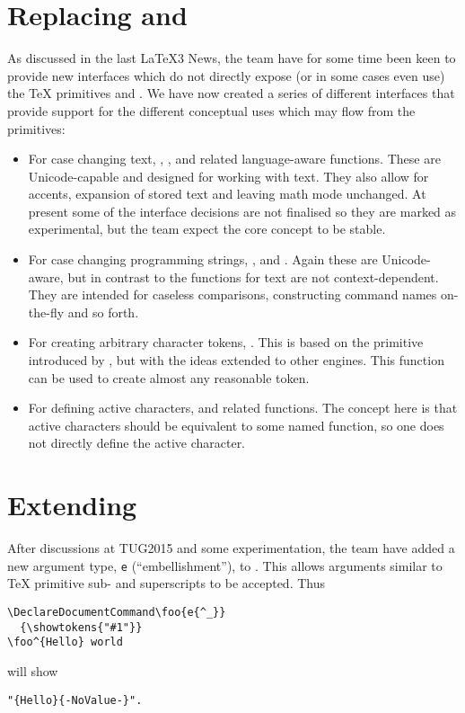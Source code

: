 \documentclass{ltnews}
\begin{document}
\section{Replacing  and }

As discussed in the last \LaTeX3 News, the team have for some time been keen to
provide new interfaces which do not directly expose (or in some cases even use)
the \TeX{} primitives  and . We have now created a
series of different interfaces that provide support for the different
conceptual uses which may flow from the primitives:
\begin{itemize}
  \item For case changing text, , ,
     and related language-aware functions. These are
    Unicode-capable and designed for working with text. They also allow for
    accents, expansion of stored text and leaving math mode unchanged.  At
    present some of the interface decisions are not finalised so they are
    marked as experimental, but the team expect the core concept to be stable.
  \item For case changing programming strings, ,
     and . Again these are
    Unicode-aware, but in contrast to the functions for text are not
    context-dependent. They are intended for caseless comparisons, constructing
    command names on-the-fly and so forth.
  \item For creating arbitrary character tokens, . This
    is based on the  primitive introduced by , but
    with the ideas extended to other engines. This function can be used to
    create almost any reasonable token.
  \item For defining active characters,  and
    related functions. The concept here is that active characters should be
    equivalent to some named function, so one does not directly define the
    active character.
\end{itemize}

\section{Extending }

After discussions at TUG2015 and some experimentation, the team have added a
new argument type, \texttt{e} (\enquote{embellishment}), to .
This allows arguments similar to
\TeX{} primitive sub- and superscripts to be accepted. Thus
\begin{verbatim}
\DeclareDocumentCommand\foo{e{^_}}
  {\showtokens{"#1"}}
\foo^{Hello} world
\end{verbatim}
will show
\begin{verbatim}
"{Hello}{-NoValue-}".
\end{verbatim}
\end{document}
